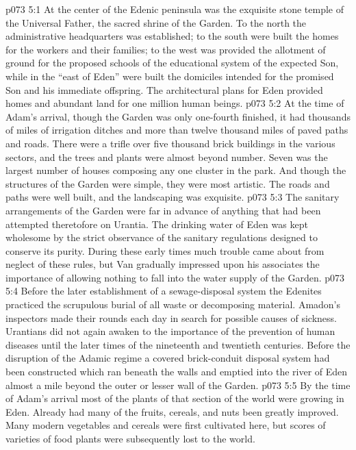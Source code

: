 \vs p073 5:1 At the center of the Edenic peninsula was the exquisite stone temple of the Universal Father, the sacred shrine of the Garden. To the north the administrative headquarters was established; to the south were built the homes for the workers and their families; to the west was provided the allotment of ground for the proposed schools of the educational system of the expected Son, while in the “east of Eden” were built the domiciles intended for the promised Son and his immediate offspring. The architectural plans for Eden provided homes and abundant land for one million human beings.
\vs p073 5:2 At the time of Adam’s arrival, though the Garden was only one\hyp{}fourth finished, it had thousands of miles of irrigation ditches and more than twelve thousand miles of paved paths and roads. There were a trifle over five thousand brick buildings in the various sectors, and the trees and plants were almost beyond number. Seven was the largest number of houses composing any one cluster in the park. And though the structures of the Garden were simple, they were most artistic. The roads and paths were well built, and the landscaping was exquisite.
\vs p073 5:3 The sanitary arrangements of the Garden were far in advance of anything that had been attempted theretofore on Urantia. The drinking water of Eden was kept wholesome by the strict observance of the sanitary regulations designed to conserve its purity. During these early times much trouble came about from neglect of these rules, but Van gradually impressed upon his associates the importance of allowing nothing to fall into the water supply of the Garden.
\vs p073 5:4 Before the later establishment of a sewage\hyp{}disposal system the Edenites practiced the scrupulous burial of all waste or decomposing material. Amadon’s inspectors made their rounds each day in search for possible causes of sickness. Urantians did not again awaken to the importance of the prevention of human diseases until the later times of the nineteenth and twentieth centuries. Before the disruption of the Adamic regime a covered brick\hyp{}conduit disposal system had been constructed which ran beneath the walls and emptied into the river of Eden almost a mile beyond the outer or lesser wall of the Garden.
\vs p073 5:5 By the time of Adam’s arrival most of the plants of that section of the world were growing in Eden. Already had many of the fruits, cereals, and nuts been greatly improved. Many modern vegetables and cereals were first cultivated here, but scores of varieties of food plants were subsequently lost to the world.
